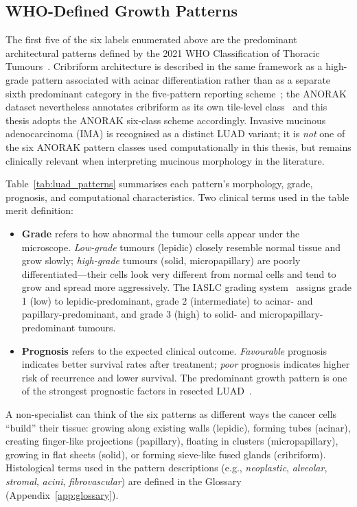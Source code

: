 \subsection{WHO-Defined Growth Patterns}
\label{sec:uc:luad:patterns}

The first five of the six labels enumerated above are the predominant architectural patterns defined by the 2021 WHO Classification of Thoracic Tumours~\cite{who2021thoracic,nicholson2022ialcslurp}.
Cribriform architecture is described in the same framework as a high-grade pattern associated with acinar differentiation rather than as a separate sixth predominant category in the five-pattern reporting scheme~\cite{who2021thoracic}; the ANORAK dataset nevertheless annotates cribriform as its own tile-level class~\cite{anorak2024} and this thesis adopts the ANORAK six-class scheme accordingly.
Invasive mucinous adenocarcinoma (IMA) is recognised as a distinct LUAD variant; it is \emph{not} one of the six ANORAK pattern classes used computationally in this thesis, but remains clinically relevant when interpreting mucinous morphology in the literature.

Table~\ref{tab:luad_patterns} summarises each pattern's morphology, grade, prognosis, and computational characteristics.
Two clinical terms used in the table merit definition:
\begin{itemize}
    \item \textbf{Grade} refers to how abnormal the tumour cells appear
    under the microscope.  \emph{Low-grade} tumours (lepidic) closely
    resemble normal tissue and grow slowly; \emph{high-grade} tumours
    (solid, micropapillary) are poorly differentiated---their cells look
    very different from normal cells and tend to grow and spread more
    aggressively.  The IASLC grading system~\cite{moreira2020ialcslurp}
    assigns grade 1 (low) to lepidic-predominant, grade 2 (intermediate)
    to acinar- and papillary-predominant, and grade 3 (high) to solid-
    and micropapillary-predominant tumours.
    \item \textbf{Prognosis} refers to the expected clinical outcome.
    \emph{Favourable} prognosis indicates better survival rates after
    treatment; \emph{poor} prognosis indicates higher risk of recurrence
    and lower survival.  The predominant growth pattern is one of the
    strongest prognostic factors in resected LUAD~\cite{who2021thoracic}.
\end{itemize}
A non-specialist can think of the six patterns as different ways the
cancer cells ``build'' their tissue: growing along existing walls
(lepidic), forming tubes (acinar), creating finger-like projections
(papillary), floating in clusters (micropapillary), growing in flat
sheets (solid), or forming sieve-like fused glands (cribriform).
Histological terms used in the pattern descriptions (e.g.,
\emph{neoplastic}, \emph{alveolar}, \emph{stromal}, \emph{acini},
\emph{fibrovascular}) are defined in the Glossary
(Appendix~\ref{app:glossary}).

